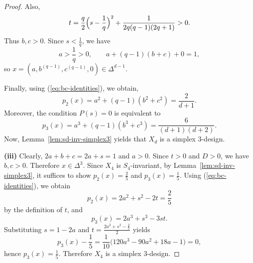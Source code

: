 \documentclass[10pt,a4paper]{amsart}
\begin{document}
\begin{proof}
Also,
\[
t=\frac{q}{2}\Bigl(s-\frac1q\Bigr)^2+\frac{1}{2q(q-1)(2q+1)}>0.
\]
Thus $b,c>0$.
Since $s<\frac1q$, we have
\[
a>\frac1q>0,
\qquad
a+(q-1)(b+c)+0=1,
\]
so $x=(a,b^{(q-1)},c^{(q-1)},0)\in\Delta^{d-1}$.

Finally, using (\ref{eq:bc-identities}), we obtain,
\[
p_2(x)=a^2+(q-1)(b^2+c^2)=\frac{2}{d+1}.
\]
Moreover, the condition $P(s)=0$ is equivalent to
\[
p_3(x)=a^3+(q-1)(b^3+c^3)=\frac{6}{(d+1)(d+2)}.
\]
Now, Lemma~\ref{lem:sd-inv-simplex3} yields that $X_d$ is a simplex $3$-design.


\textbf{(iii)}
Clearly, $2a+b+c=2a+s=1$ and $a>0$. Since $t>0$ and $D>0$, we have $b,c>0$.
Therefore $x\in\Delta^3$.
Since $X_4$ is $S_4$-invariant, by Lemma~\ref{lem:sd-inv-simplex3}, it suffices to show
$p_2(x)=\frac25$ and $p_3(x)=\frac15$.
Using (\ref{eq:bc-identities}), we obtain
\[
p_2(x)=2a^2+s^2-2t=\frac25
\]
by the definition of $t$, and
\[
p_3(x)=2a^3+s^3-3st.
\]
Substituting $s=1-2a$ and $t=\frac{2a^2+s^2-\frac25}{2}$ yields
\[
p_3(x)-\frac15=\frac1{10}\bigl(120a^3-90a^2+18a-1\bigr)=0,
\]
hence $p_3(x)=\frac15$. Therefore $X_4$ is a simplex $3$-design.
\end{proof}
\end{document}
